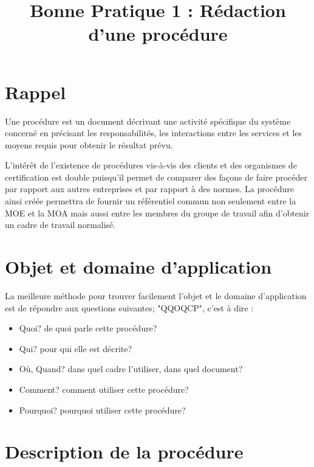 \documentclass[a4paper]{article}
\begin{document}
\title{Bonne Pratique 1 : Rédaction d'une procédure}
\maketitle


\section{Rappel}

Une procédure est un document décrivant une activité spécifique du système concerné en précisant les responsabilités, les interactions entre les services et les moyens requis pour obtenir le résultat prévu.

L'intérêt de l'existence de procédures vis-à-vis des clients et des organismes de certification est double puisqu'il permet de comparer des façons de faire procéder par rapport aux autres entreprises et par rapport à des normes. La procédure ainsi créée permettra de fournir un référentiel commun non seulement entre la MOE et la MOA mais aussi entre les membres du groupe de travail afin d'obtenir un cadre de travail normalisé.

\section{Objet et domaine d'application}


La meilleure méthode pour trouver facilement l'objet et le domaine d'application est de répondre aux questions suivantes; "QQOQCP", c'est à dire :

\begin{itemize}
\item Quoi? de quoi parle cette procédure?
\item Qui? pour qui elle est décrite?
\item Où, Quand? dans quel cadre l'utiliser, dans quel document?
\item Comment? comment utiliser cette procédure?
\item Pourquoi? pourquoi utiliser cette procédure?
\end{itemize}

\section{Description de la procédure}
\end{document}
